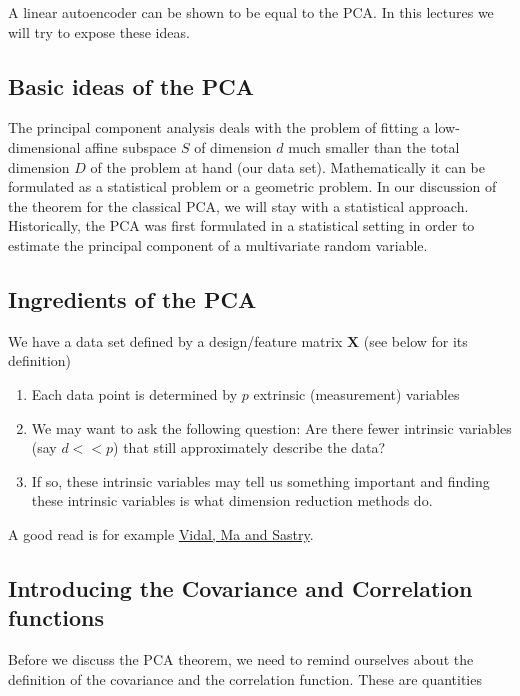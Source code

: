 \documentclass[%
oneside,                 %
final,                   %
10pt]{article}
\begin{document}
A linear autoencoder can be shown to be equal to the PCA.
In this lectures we will try to expose these ideas.

\subsection{Basic ideas of the PCA}

The principal component analysis deals with the problem of fitting a
low-dimensional affine subspace $S$ of dimension $d$ much smaller than
the total dimension $D$ of the problem at hand (our data
set). Mathematically it can be formulated as a statistical problem or
a geometric problem.  In our discussion of the theorem for the
classical PCA, we will stay with a statistical approach. 
Historically, the PCA was first formulated in a statistical setting in order to estimate the principal component of a multivariate random variable.

\subsection{Ingredients of the PCA}

We have a data set defined by a design/feature matrix $\bm{X}$ (see below for its definition) 
\begin{enumerate}
\item Each data point is determined by $p$ extrinsic (measurement) variables

\item We may want to ask the following question: Are there fewer intrinsic variables (say $d << p$) that still approximately describe the data?

\item If so, these intrinsic variables may tell us something important and finding these intrinsic variables is what dimension reduction methods do. 
\end{enumerate}

\noindent
A good read is for example \href{{https://www.springer.com/gp/book/9780387878102}}{Vidal, Ma and Sastry}.

\subsection{Introducing the Covariance and Correlation functions}

Before we discuss the PCA theorem, we need to remind ourselves about
the definition of the covariance and the correlation function. These are quantities 
\end{document}
